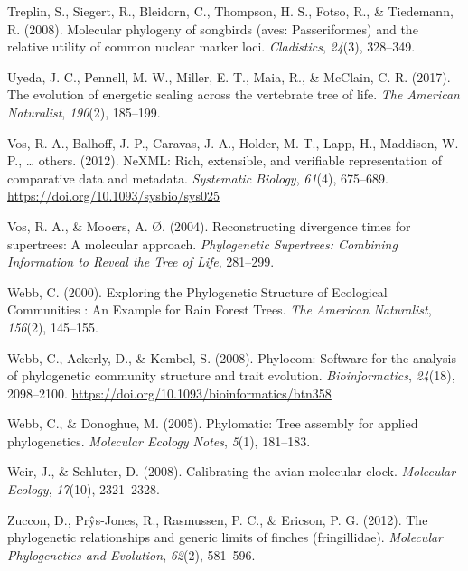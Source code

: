 \documentclass[english,man]{apa6}
\begin{document}
\leavevmode\hypertarget{ref-treplin2008molecular}{}%
Treplin, S., Siegert, R., Bleidorn, C., Thompson, H. S., Fotso, R., \& Tiedemann, R. (2008). Molecular phylogeny of songbirds (aves: Passeriformes) and the relative utility of common nuclear marker loci. \emph{Cladistics}, \emph{24}(3), 328--349.

\leavevmode\hypertarget{ref-uyeda2017evolution}{}%
Uyeda, J. C., Pennell, M. W., Miller, E. T., Maia, R., \& McClain, C. R. (2017). The evolution of energetic scaling across the vertebrate tree of life. \emph{The American Naturalist}, \emph{190}(2), 185--199.

\leavevmode\hypertarget{ref-vos2012nexml}{}%
Vos, R. A., Balhoff, J. P., Caravas, J. A., Holder, M. T., Lapp, H., Maddison, W. P., \ldots{} others. (2012). NeXML: Rich, extensible, and verifiable representation of comparative data and metadata. \emph{Systematic Biology}, \emph{61}(4), 675--689. \url{https://doi.org/10.1093/sysbio/sys025}

\leavevmode\hypertarget{ref-vos2004reconstructing}{}%
Vos, R. A., \& Mooers, A. Ø. (2004). Reconstructing divergence times for supertrees: A molecular approach. \emph{Phylogenetic Supertrees: Combining Information to Reveal the Tree of Life}, 281--299.

\leavevmode\hypertarget{ref-Webb2000}{}%
Webb, C. (2000). Exploring the Phylogenetic Structure of Ecological Communities : An Example for Rain Forest Trees. \emph{The American Naturalist}, \emph{156}(2), 145--155.

\leavevmode\hypertarget{ref-Webb2008}{}%
Webb, C., Ackerly, D., \& Kembel, S. (2008). Phylocom: Software for the analysis of phylogenetic community structure and trait evolution. \emph{Bioinformatics}, \emph{24}(18), 2098--2100. \url{https://doi.org/10.1093/bioinformatics/btn358}

\leavevmode\hypertarget{ref-webb2005phylomatic}{}%
Webb, C., \& Donoghue, M. (2005). Phylomatic: Tree assembly for applied phylogenetics. \emph{Molecular Ecology Notes}, \emph{5}(1), 181--183.

\leavevmode\hypertarget{ref-weir2008calibrating}{}%
Weir, J., \& Schluter, D. (2008). Calibrating the avian molecular clock. \emph{Molecular Ecology}, \emph{17}(10), 2321--2328.

\leavevmode\hypertarget{ref-zuccon2012phylogenetic}{}%
Zuccon, D., Prŷs-Jones, R., Rasmussen, P. C., \& Ericson, P. G. (2012). The phylogenetic relationships and generic limits of finches (fringillidae). \emph{Molecular Phylogenetics and Evolution}, \emph{62}(2), 581--596.
\end{document}
